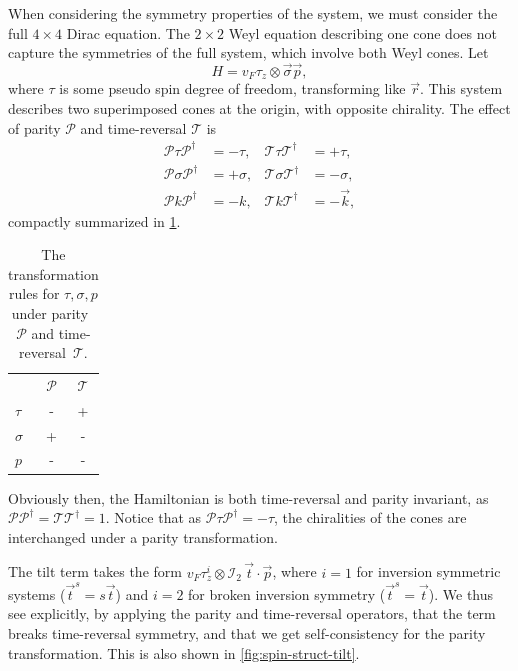 When considering the symmetry properties of the system, we must consider the full \( 4\times 4 \) Dirac equation.
The \( 2\times 2 \) Weyl equation describing one cone does not capture the symmetries of the full system, which involve both Weyl cones.
Let
\[
  H = v_{F} \tau _{z} \otimes \vec{\sigma} \vec{p},
\]
where \(\tau \) is some pseudo spin degree of freedom, transforming like \(\vec{r}\).
This system describes two superimposed cones at the origin, with opposite chirality.
The effect of parity \(\mathcal{P}\) and time-reversal \(\mathcal{T}\) is
\begin{equation}
  \label{eq:135}
  \begin{aligned}
    \mathcal{P} \tau \mathcal{P}^{\dagger} &= -\tau, & \mathcal{T} \tau \mathcal{T}^{\dagger} &= +\tau,\\
    \mathcal{P} \sigma  \mathcal{P}^{\dagger} &= + \sigma,  & \mathcal{T} \sigma  \mathcal{T}^{\dagger} &= -\sigma, \\
    \mathcal{P} k \mathcal{P}^{\dagger} &= -k, & \mathcal{T} k \mathcal{T}^{\dagger} &= -\vec{k},
  \end{aligned}
\end{equation}
compactly summarized in \cref{tab:sign-transform}.
\begin{table}[h]
  \centering
  \caption{The transformation rules for \( \tau, \sigma, p \) under parity~\( \mathcal{P} \) and time-reversal~\( \mathcal{T} \).%
   \label{tab:sign-transform}}
  \begin{tabular}{lcc}
    \toprule
    & \(\mathcal{P}\) & \(\mathcal{T}\)\\
    \cmidrule{2-3}
    \(\tau \) & - & +\\
    \(\sigma \) & + & -\\
    \(p\) & - & -\\
    \bottomrule
  \end{tabular}
\end{table}
Obviously then, the Hamiltonian is both time-reversal and parity invariant, as \(\mathcal{P} \mathcal{P}^{\dagger} = \mathcal{T} \mathcal{T}^{\dagger} = 1\).
Notice that as \( \mathcal{P} \tau \mathcal{P}^{\dagger} = - \tau \), the chiralities of the cones are interchanged under a parity transformation.

The tilt term takes the form \(v_F \tau_z^i \otimes \mathcal{I}_{2} \, \vec{t} \cdot \vec{p} \), where \( i=1 \) for inversion symmetric systems (\( \vec{t}^s = s \vec{t} \)) and \( i=2 \) for broken inversion symmetry (\( \vec{t}^s = \vec{t} \)).
We thus see explicitly, by applying the parity and time-reversal operators, that the term breaks time-reversal symmetry, and that we get self-consistency for the parity transformation.
This is also shown in \cref{fig:spin-struct-tilt}.

